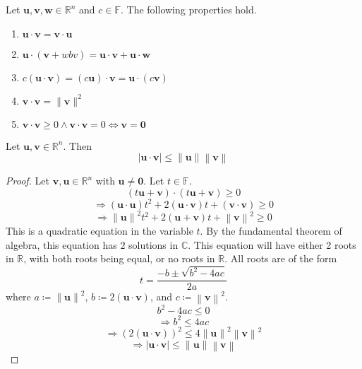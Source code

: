 \begin{theorem}
    Let \(\mathbf{u} ,\mathbf{v} ,\mathbf{w} \in\mathbb{R} ^n\) and \(c\in\mathbb{F} \). The following properties hold.
    \begin{enumerate}
        \item \(\mathbf{u} \cdot \mathbf{v} =\mathbf{v} \cdot \mathbf{u} \) 
        \item \(\mathbf{u} \cdot (\mathbf{v} +wbv) = \mathbf{u} \cdot \mathbf{v}  + \mathbf{u} \cdot \mathbf{w} \) 
        \item \(c(\mathbf{u} \cdot \mathbf{v} )=(c \mathbf{u} )\cdot \mathbf{v} = \mathbf{u} \cdot (c \mathbf{v} )\) 
        \item \(\mathbf{v} \cdot \mathbf{v} = \lVert \mathbf{v}  \rVert^2 \) 
        \item \(\mathbf{v} \cdot \mathbf{v} \geq 0 \land \mathbf{v} \cdot \mathbf{v} =0 \iff \mathbf{v} =\mathbf{0} \) 
    \end{enumerate}
\end{theorem}
\begin{theorem}\label{Cauchy-Schwartz}
    Let \(\mathbf{u} ,\mathbf{v} \in\mathbb{R} ^n\). Then
    \[
        \left\vert \mathbf{u} \cdot \mathbf{v}  \right\vert \leq \left\lVert \mathbf{u}  \right\rVert \left\lVert \mathbf{v}  \right\rVert 
    \]
\end{theorem}
\begin{proof}
    Let \(\mathbf{v} ,\mathbf{u} \in\mathbb{R} ^n\) with \(\mathbf{u} \neq \mathbf{0} \). Let \(t\in\mathbb{F} \).
    \[
        (t \mathbf{u} +\mathbf{v} )\cdot (t \mathbf{u} +\mathbf{v} )\geq 0
    \]
    \[
        \Longrightarrow (\mathbf{u} \cdot \mathbf{u} )t^2 + 2(\mathbf{u} \cdot \mathbf{v} )t+(\mathbf{v} \cdot \mathbf{v} )\geq 0
    \]
    \[
        \Longrightarrow \left\lVert \mathbf{u}  \right\rVert^2 t^2 + 2(\mathbf{u} +\mathbf{v} )t +\left\lVert \mathbf{v}  \right\rVert^2 \geq 0 
    \]
    This is a quadratic equation in the variable \(t\). By the fundamental theorem of algebra, this equation has \(2\) solutions in \(\mathbb{C} \). This equation will have either 2 roots in \(\mathbb{R} \), with both roots being equal, or no roots in \(\mathbb{R} \). All roots are of the form
    \[
        t = \frac{-b \pm \sqrt{b^2 - 4ac} }{2a}
    \]
    where \(a\coloneqq \left\lVert  \mathbf{u}  \right\rVert^2 \), \(b\coloneqq 2(\mathbf{u} \cdot \mathbf{v} )\), and \(c\coloneqq \left\lVert \mathbf{v}  \right\rVert^2 \).
    \[
        b^2 - 4ac \leq 0
    \]
    \[
        \Longrightarrow b^2 \leq 4ac
    \]
    \[
        \Longrightarrow (2(\mathbf{u} \cdot \mathbf{v} ))^2 \leq 4 \left\lVert \mathbf{u}  \right\rVert^2 \left\lVert \mathbf{v}  \right\rVert^2  
    \]
    \[
        \Longrightarrow\left|\mathbf{u} \cdot \mathbf{v}\right| \leq \left\lVert \mathbf{u}  \right\rVert \left\lVert \mathbf{v}  \right\rVert 
    \]
\end{proof}